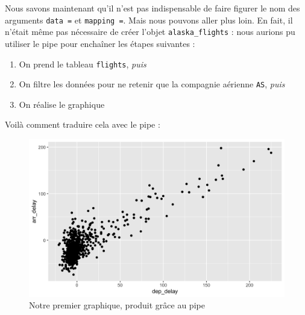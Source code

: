 \documentclass[a4paperpaper,]{article}
\newenvironment{Shaded}{\begin{snugshade}}{\end{snugshade}}
\newcommand{\DataTypeTok}[1]{\textcolor[rgb]{0.00,0.34,0.68}{#1}}
\newcommand{\KeywordTok}[1]{\textcolor[rgb]{0.12,0.11,0.11}{\textbf{#1}}}
\newcommand{\NormalTok}[1]{\textcolor[rgb]{0.12,0.11,0.11}{#1}}
\newcommand{\OperatorTok}[1]{\textcolor[rgb]{0.12,0.11,0.11}{#1}}
\newcommand{\StringTok}[1]{\textcolor[rgb]{0.75,0.01,0.01}{#1}}
\providecommand{\tightlist}{%
  \setlength{\itemsep}{0pt}\setlength{\parskip}{0pt}}
\begin{document}
Nous savons maintenant qu'il n'est pas indispensable de faire figurer le nom des arguments \texttt{data\ =} et \texttt{mapping\ =}. Mais nous pouvons aller plus loin. En fait, il n'était même pas nécessaire de créer l'objet \texttt{alaska\_flights} : nous aurions pu utiliser le pipe pour enchaîner les étapes suivantes :

\begin{enumerate}
\def\labelenumi{\arabic{enumi}.}
\tightlist
\item
  On prend le tableau \texttt{flights}, \emph{puis}
\item
  On filtre les données pour ne retenir que la compagnie aérienne \texttt{AS}, \emph{puis}
\item
  On réalise le graphique
\end{enumerate}

Voilà comment traduire cela avec le pipe :

\begin{Shaded}
\end{Shaded}

\begin{figure}[htpb]

{\centering \includegraphics[width=0.9\linewidth]{figure/unnamed-chunk-92-1} 

}

\caption{Notre premier graphique, produit grâce au pipe}\label{fig:unnamed-chunk-92}
\end{figure}
\end{document}
